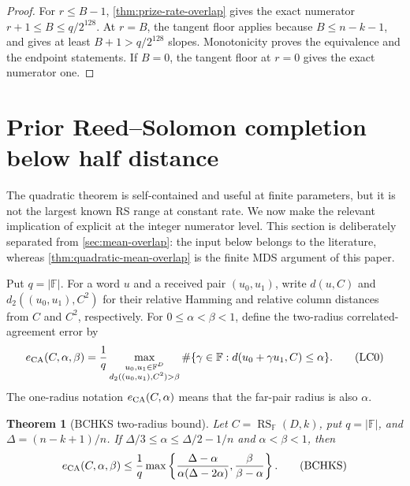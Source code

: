 \documentclass[11pt,a4paper]{amsart}
\numberwithin{equation}{section}
\newtheorem{theorem}{Theorem}[section]
\theoremstyle{remark}
\DeclareMathOperator{\RS}{RS}
\newcommand{\F}{\mathbb F}
\newcommand{\abs}[1]{\lvert #1\rvert}
\begin{document}
\begin{proof}
For \(r\le B-1\), \cref{thm:prize-rate-overlap} gives the exact
numerator \(r+1\le B\le q/2^{128}\).  At \(r=B\), the tangent floor
applies because \(B\le n-k-1\), and gives at least
\(B+1>q/2^{128}\) slopes.  Monotonicity proves the
equivalence and the endpoint statements.  If \(B=0\), the tangent floor
at \(r=0\) gives the exact numerator one.
\end{proof}


\section{Prior Reed--Solomon completion below half distance}
\label{sec:literature-completion}

The quadratic theorem is self-contained and useful at finite parameters,
but it is not the largest known RS range at constant rate.  We now make
the relevant implication of \cite{BCHKS25} explicit at the integer
numerator level.  This section is deliberately separated from
\cref{sec:mean-overlap}: the input below belongs to the literature,
whereas \cref{thm:quadratic-mean-overlap} is the finite MDS argument of
this paper.

Put \(q=\abs\F\).  For a word \(u\) and a received pair \((u_0,u_1)\), write
\(d(u,C)\) and \(d_2((u_0,u_1),C^2)\) for their relative Hamming and
relative column distances from \(C\) and \(C^2\), respectively.  For
\(0\le\alpha<\beta<1\), define the two-radius correlated-agreement error
by
\[
 e_{\rm CA}(C,\alpha,\beta)
 =\frac1q\max_{\substack{u_0,u_1\in\F^D\\
                  d_2((u_0,u_1),C^2)>\beta}}
   \#\{\gamma\in\F:d(u_0+\gamma u_1,C)\le\alpha\}.       \tag{LC0}
 \label{eq:two-radius-ca}
\]
The one-radius notation \(e_{\rm CA}(C,\alpha)\) means that the far-pair
radius is also \(\alpha\).

\begin{theorem}[BCHKS two-radius bound]
\label{thm:bchks-two-radius}
Let \(C=\RS_\F(D,k)\), put \(q=\abs\F\),
and \(\Delta=(n-k+1)/n\).  If
\(\Delta/3\le\alpha\le\Delta/2-1/n\) and
\(\alpha<\beta<1\), then
\[
 e_{\rm CA}(C,\alpha,\beta)
 \le \frac1q\max\left\{
   \frac{\Delta-\alpha}{\alpha(\Delta-2\alpha)},
   \frac{\beta}{\beta-\alpha}
                         \right\}.              \tag{BCHKS}
 \label{eq:bchks-two-radius}
\]
\end{theorem}
\end{document}
